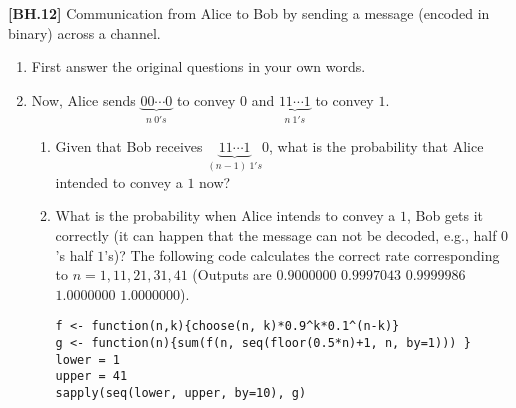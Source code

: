 \begin{exercise}
	\textbf{[BH.12]} Communication from Alice to Bob by sending a message (encoded in binary) across a channel.  
	\begin{enumerate}
		\item First answer the original questions in your own words.
		\item Now, Alice sends $\underbrace{00\cdots0}_{n \  0's}$ to convey $0$ and $\underbrace{11\cdots1}_{n \  1's}$ to convey $1$. 
		\begin{enumerate}
			\item Given that Bob receives $\underbrace{11\cdots1}_{(n-1) \ 1's}0$, what is the probability that Alice intended to convey a $1$ now? 
			\item What is the probability when Alice intends to convey a $1$, Bob gets it correctly (it can happen that the message can not be decoded, e.g., half $0$'s half $1$'s)? The following code calculates the correct rate corresponding to $n=1,11,21,31,41$  (Outputs are $0.9000000$ $0.9997043$ $0.9999986$ $1.0000000$ $1.0000000$).
			\begin{verbatim}
f <- function(n,k){choose(n, k)*0.9^k*0.1^(n-k)}
g <- function(n){sum(f(n, seq(floor(0.5*n)+1, n, by=1))) } 
lower = 1
upper = 41
sapply(seq(lower, upper, by=10), g)
			\end{verbatim} 
		\end{enumerate}
		
	\end{enumerate}  
\end{exercise}
